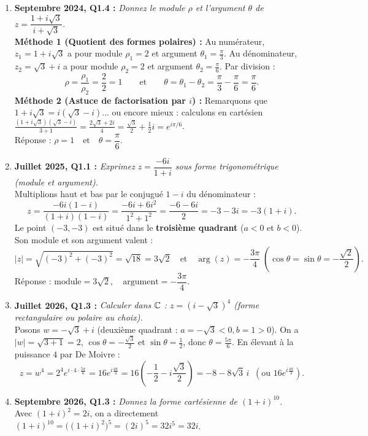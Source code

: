 \begin{exemple}
\begin{enumerate}
    \item \textbf{Septembre 2024, Q1.4 :} \emph{Donnez le module $\rho$ et l'argument $\theta$ de $z = \dfrac{1 + i\sqrt{3}}{i + \sqrt{3}}$.}\\
    \textbf{Méthode 1 (Quotient des formes polaires) :} Au numérateur, $z_1 = 1 + i\sqrt{3}$ a pour module $\rho_1 = 2$ et argument $\theta_1 = \frac{\pi}{3}$. Au dénominateur, $z_2 = \sqrt{3} + i$ a pour module $\rho_2 = 2$ et argument $\theta_2 = \frac{\pi}{6}$. Par division :
    \[
        \rho = \frac{\rho_1}{\rho_2} = \frac{2}{2} = 1 \qquad \text{et} \qquad \theta = \theta_1 - \theta_2 = \frac{\pi}{3} - \frac{\pi}{6} = \frac{\pi}{6}.
    \]
    \textbf{Méthode 2 (Astuce de factorisation par $i$) :} Remarquons que $1 + i\sqrt{3} = i(\sqrt{3} - i)$... ou encore mieux : calculons en cartésien $\frac{(1+i\sqrt{3})(\sqrt{3}-i)}{3+1} = \frac{2\sqrt{3} + 2i}{4} = \frac{\sqrt{3}}{2} + \frac{1}{2}i = e^{i\pi/6}$.\\
    Réponse : $\boxed{\rho = 1 \quad \text{et} \quad \theta = \dfrac{\pi}{6}}$.

    \item \textbf{Juillet 2025, Q1.1 :} \emph{Exprimez $z = \dfrac{-6i}{1 + i}$ sous forme trigonométrique (module et argument).}\\
    Multiplions haut et bas par le conjugué $1 - i$ du dénominateur :
    \[
        z = \frac{-6i(1 - i)}{(1 + i)(1 - i)} = \frac{-6i + 6i^2}{1^2 + 1^2} = \frac{-6 - 6i}{2} = -3 - 3i = -3(1 + i).
    \]
    Le point $(-3, -3)$ est situé dans le \textbf{troisième quadrant} ($a < 0$ et $b < 0$). Son module et son argument valent :
    \[
        |z| = \sqrt{(-3)^2 + (-3)^2} = \sqrt{18} = 3\sqrt{2} \quad \text{et} \quad \arg(z) = -\frac{3\pi}{4} \;\left(\cos\theta = \sin\theta = -\frac{\sqrt{2}}{2}\right).
    \]
    Réponse : $\boxed{\text{module} = 3\sqrt{2}, \quad \text{argument} = -\dfrac{3\pi}{4}}$.

    \item \textbf{Juillet 2026, Q1.3 :} \emph{Calculer dans $\mathbb{C}$ : $z = (i - \sqrt{3})^4$ (forme rectangulaire ou polaire au choix).}\\
    Posons $w = -\sqrt{3} + i$ (deuxième quadrant : $a = -\sqrt{3} < 0, b = 1 > 0$). On a $|w| = \sqrt{3 + 1} = 2$, $\cos\theta = -\frac{\sqrt{3}}{2}$ et $\sin\theta = \frac{1}{2}$, donc $\theta = \frac{5\pi}{6}$.
    En élevant à la puissance $4$ par De Moivre :
    \[
        z = w^4 = 2^4 e^{i \cdot 4 \cdot \frac{5\pi}{6}} = 16 e^{i \frac{4\pi}{3}} = 16\left(-\frac{1}{2} - i\frac{\sqrt{3}}{2}\right) = \boxed{-8 - 8\sqrt{3}\,i \;\;\left(\text{ou } 16 e^{i\frac{4\pi}{3}}\right)}.
    \]

    \item \textbf{Septembre 2026, Q1.3 :} \emph{Donnez la forme cartésienne de $(1 + i)^{10}$.}\\
    Avec $(1 + i)^2 = 2i$, on a directement $(1 + i)^{10} = \bigl((1 + i)^2\bigr)^5 = (2i)^5 = 32 i^5 = \boxed{32i}$.
\end{enumerate}
\end{exemple}

